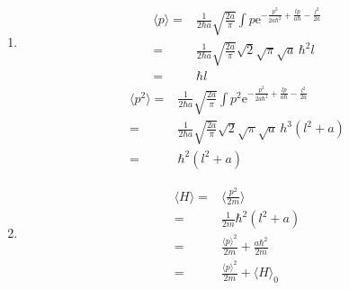 \begin{enumerate}
\begin{align*}
        \sqrt{\frac{2a}{\pi}}
        \mathrm{e}^{-\frac{p^{2}}{2a\hbar^{2}} + \frac{lp}{a\hbar} - \frac{l^{2}}{2a}}
    \end{align*}
    \item 
    \begin{align*}
        \langle p\rangle
        =&\frac{1}{2\hbar a}
        \sqrt{\frac{2a}{\pi}}
        \int
        p
        \mathrm{e}^{-\frac{p^{2}}{2a\hbar^{2}} + \frac{lp}{a\hbar} - \frac{l^{2}}{2a}}\\
        =&\frac{1}{2\hbar a}
        \sqrt{\frac{2a}{\pi}}
        \sqrt{2} \sqrt{\pi} \sqrt{a} \, \hbar^{2} l\\
        =&\hbar l
    \end{align*}
    \begin{align*}
        \langle p^2\rangle
        =&\frac{1}{2\hbar a}
        \sqrt{\frac{2a}{\pi}}
        \int
        p^2
        \mathrm{e}^{-\frac{p^{2}}{2a\hbar^{2}} + \frac{lp}{a\hbar} - \frac{l^{2}}{2a}}\\
        =&\frac{1}{2\hbar a}
        \sqrt{\frac{2a}{\pi}}
        \sqrt{2} \sqrt{\pi} \sqrt{a} \, h^{3} \left(l^{2} + a\right)\\
        =&\hbar^{2} \left(l^{2} + a\right)
    \end{align*}
    \item 
    \begin{align*}
        \langle H\rangle
        =&\langle \frac{p^2}{2m}\rangle\\
        =&\frac{1}{2m}\hbar^2(l
        ^2+a)\\
        =&\frac{\langle p\rangle^2}{2m}
        +\frac{a\hbar^2}{2m}\\
        =&\frac{\langle p\rangle^2}{2m}
        +\langle H\rangle_0
    \end{align*}
\end{enumerate}